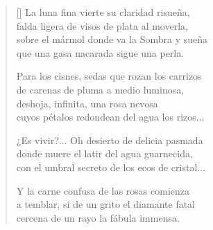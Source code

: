 



\settowidth{\versewidth}{Con el umbral secreto de los ecos de cristal...}

\bigskip

\begin{verse}[\versewidth]
  La luna fina vierte su claridad risueña, \\
  falda ligera de visos de plata al moverla, \\
  sobre el mármol donde va la Sombra y sueña \\
  que una gasa nacarada sigue una perla.

  Para los cisnes, sedas que rozan los carrizos \\
  de carenas de pluma a medio luminosa, \\
  deshoja, infinita, una rosa nevosa \\
  cuyos pétalos redondean del agua los rizos...

  ¿Es vivir?... Oh desierto de delicia pasmada \\
  donde muere el latir del agua guarnecida, \\
  con el umbral secreto de los ecos de cristal...

  Y la carne confusa de las rosas comienza \\
  a temblar, si de un grito el diamante fatal \\
  cercena de un rayo la fábula immensa.
\end{verse}

\newpage



\settowidth{\versewidth}{Dont les pétales font des cercles sur les eaux...}

\bigskip

